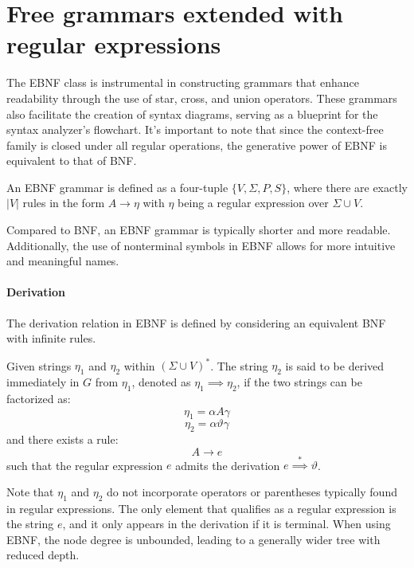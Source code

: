 \section{Free grammars extended with regular expressions}


The EBNF class is instrumental in constructing grammars that enhance readability through the use of star, cross, and union operators. 
These grammars also facilitate the creation of syntax diagrams, serving as a blueprint for the syntax analyzer's flowchart.
It's important to note that since the context-free family is closed under all regular operations, the generative power of EBNF is equivalent to that of BNF.
\begin{definition}
    An EBNF grammar is defined as a four-tuple $\{V, \Sigma, P, S\}$, where there are exactly $\left\lvert V \right\rvert$ rules in the form $A \rightarrow \eta$ with $\eta$ being a regular expression over $\Sigma \cup V$.
\end{definition}
Compared to BNF, an EBNF grammar is typically shorter and more readable. 
Additionally, the use of nonterminal symbols in EBNF allows for more intuitive and meaningful names.

\paragraph*{Derivation}
The derivation relation in EBNF is defined by considering an equivalent BNF with infinite rules. 
\begin{definition}
    Given strings $\eta_1$ and $\eta_2$ within $(\Sigma \cup V)^{*}$. 
    The string $\eta_2$ is said to be derived immediately in $G$ from $\eta_1$, denoted as $\eta_1 \implies \eta_2$, if the two strings can be factorized as: 
    \[\eta_1=\alpha A \gamma\]
    \[\eta_2=\alpha \vartheta \gamma\]
    and there exists a rule: 
    \[A \rightarrow e\]
    such that the regular expression $e$ admits the derivation $e \overset{*}{\implies} \vartheta$. 
\end{definition}
Note that $\eta_1$ and $\eta_2$ do not incorporate operators or parentheses typically found in regular expressions.
The only element that qualifies as a regular expression is the string $e$, and it only appears in the derivation if it is terminal.
When using EBNF, the node degree is unbounded, leading to a generally wider tree with reduced depth.